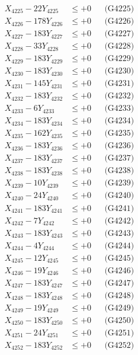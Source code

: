 \documentclass[a4paper,10pt]{article}
\begin{document}
{\begin{align}
X_{4225} - 22Y_{4225} &\leq +0 && \text{(G4225)} \\
X_{4226} - 178Y_{4226} &\leq +0 && \text{(G4226)} \\
X_{4227} - 183Y_{4227} &\leq +0 && \text{(G4227)} \\
X_{4228} - 33Y_{4228} &\leq +0 && \text{(G4228)} \\
X_{4229} - 183Y_{4229} &\leq +0 && \text{(G4229)} \\
X_{4230} - 183Y_{4230} &\leq +0 && \text{(G4230)} \\
\allowbreak
X_{4231} - 145Y_{4231} &\leq +0 && \text{(G4231)} \\
X_{4232} - 183Y_{4232} &\leq +0 && \text{(G4232)} \\
X_{4233} - 6Y_{4233} &\leq +0 && \text{(G4233)} \\
X_{4234} - 183Y_{4234} &\leq +0 && \text{(G4234)} \\
X_{4235} - 162Y_{4235} &\leq +0 && \text{(G4235)} \\
X_{4236} - 183Y_{4236} &\leq +0 && \text{(G4236)} \\
X_{4237} - 183Y_{4237} &\leq +0 && \text{(G4237)} \\
X_{4238} - 183Y_{4238} &\leq +0 && \text{(G4238)} \\
X_{4239} - 10Y_{4239} &\leq +0 && \text{(G4239)} \\
X_{4240} - 24Y_{4240} &\leq +0 && \text{(G4240)} \\
\allowbreak
X_{4241} - 183Y_{4241} &\leq +0 && \text{(G4241)} \\
X_{4242} - 7Y_{4242} &\leq +0 && \text{(G4242)} \\
X_{4243} - 183Y_{4243} &\leq +0 && \text{(G4243)} \\
X_{4244} - 4Y_{4244} &\leq +0 && \text{(G4244)} \\
X_{4245} - 12Y_{4245} &\leq +0 && \text{(G4245)} \\
X_{4246} - 19Y_{4246} &\leq +0 && \text{(G4246)} \\
X_{4247} - 183Y_{4247} &\leq +0 && \text{(G4247)} \\
X_{4248} - 183Y_{4248} &\leq +0 && \text{(G4248)} \\
X_{4249} - 19Y_{4249} &\leq +0 && \text{(G4249)} \\
X_{4250} - 183Y_{4250} &\leq +0 && \text{(G4250)} \\
\allowbreak
X_{4251} - 24Y_{4251} &\leq +0 && \text{(G4251)} \\
X_{4252} - 183Y_{4252} &\leq +0 && \text{(G4252)} \\

\end{align}}
\end{document}
